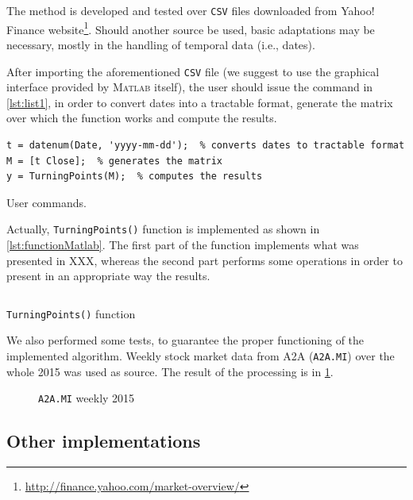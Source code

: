 \documentclass[a4paper]{article}
\newcommand{\matlab}{\textsc{Matlab}\xspace}
\newcommand{\csv}{\texttt{CSV}\xspace}
\begin{document}
The method is developed and tested over \csv files downloaded from Yahoo! Finance website\footnote{\url{http://finance.yahoo.com/market-overview/}}. Should another source be used, basic adaptations may be necessary, mostly in the handling of temporal data (i.e., dates). 

After importing the aforementioned \csv file (we suggest to use the graphical interface provided by \matlab itself), the user should issue the command in \cref{lst:list1}, in order to convert dates into a tractable format, generate the matrix over which the function works and compute the results.

\begin{listing}[H]

\begin{verbatim}
t = datenum(Date, 'yyyy-mm-dd');  % converts dates to tractable format
M = [t Close];  % generates the matrix
y = TurningPoints(M);  % computes the results
\end{verbatim}

\caption{User commands.}\label{lst:list1}

\end{listing}

Actually, \texttt{TurningPoints()} function is implemented as shown in \cref{lst:functionMatlab}. The first part of the function implements what was presented in XXX, whereas the second part performs some operations in order to present in an appropriate way the results.

\begin{listing}[H]

\inputminted{matlab}{../code/TurningPoints.m}

\caption{\texttt{TurningPoints()} function}\label{lst:functionMatlab}

\end{listing}
 
We also performed some tests, to guarantee the proper functioning of the implemented algorithm. Weekly stock market data from A2A (\texttt{A2A.MI}) over the whole 2015 was used as source. The result of the processing is in \cref{fig:a2a_w_2015}.

\begin{figure}
	
	
	\caption{\texttt{A2A.MI} weekly 2015}
	
	\label{fig:a2a_w_2015}

\end{figure}



\subsection{Other implementations}
\lipsum[4-6]
\end{document}
